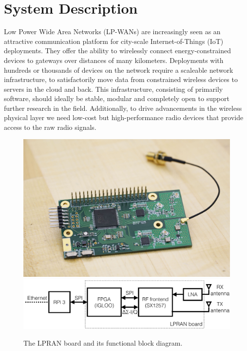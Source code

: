 \documentclass[conference]{IEEEtran}
\begin{document}
\IEEEpeerreviewmaketitle


\section{System Description}
\label{sec:system}

Low Power Wide Area Networks (LP-WANs) are increasingly seen as an attractive
communication platform for city-scale Internet-of-Things (IoT) deployments.
They offer the ability to wirelessly connect energy-constrained devices to
gateways over distances of many kilometers. Deployments with hundreds or
thousands of devices on the network require a scaleable network
infrastructure, to satisfactorily move data from constrained wireless devices
to servers in the cloud and back. This infrastructure, consisting of primarily
software, should ideally be stable, modular and completely open to support
further research in the field. Additionally, to drive advancements in the
wireless physical layer we need low-cost but high-performance radio devices
that provide access to the raw radio signals.

\begin{figure}[!htb]
    \centering
    \includegraphics[width=0.5\linewidth]{figures/gw-anon-sm}
    \\
    \includegraphics[width=0.8\linewidth]{figures/lpran-block_cropped}
    \caption{The LPRAN board and its functional block diagram.}
    \label{fig:lpran-photo}
\end{figure}
\end{document}
